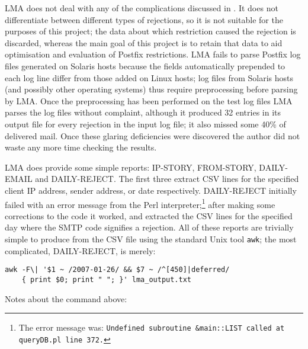 \gls{LMA} does not deal with any of the complications discussed in
.  It does not differentiate between different
types of rejections, so it is not suitable for the purposes of this
project; the data about which restriction caused the rejection is
discarded, whereas the main goal of this project is to retain that data to
aid optimisation and evaluation of Postfix restrictions.  \gls{LMA} fails
to parse Postfix log files generated on Solaris hosts because the fields
automatically prepended to each log line differ from those added on Linux
hosts; log files from Solaris hosts (and possibly other operating systems)
thus require preprocessing before parsing by \gls{LMA}.  Once the
preprocessing has been performed on the \numberOFlogFILES{} test log files
\gls{LMA} parses the log files without complaint, although it produced 32
entries in its output file for every rejection in the input log file; it
also missed some 40\% of delivered mail.  Once these glaring deficiencies
were discovered the author did not waste any more time checking the
results.

\gls{LMA} does provide some simple reports: IP-STORY, FROM-STORY,
DAILY-EMAIL and DAILY-REJECT\@.  The first three extract \gls{CSV} lines
for the specified client \gls{IP} address, sender address, or date
respectively.  DAILY-REJECT initially failed with an error message from the
Perl interpreter;\footnote{The error message was:
\newline{}\texttt{Undefined subroutine \&main::LIST called at queryDB.pl
line 372.}} after making some corrections to the code it worked, and
extracted the \gls{CSV} lines for the specified day where the \gls{SMTP}
code signifies a rejection.  All of these reports are trivially simple to
produce from the \gls{CSV} file using the standard Unix tool
\texttt{awk}; the most complicated, DAILY-REJECT, is merely:

\begin{verbatim}
awk -F\| '$1 ~ /2007-01-26/ && $7 ~ /^[450]|deferred/
    { print $0; print " "; }' lma_output.txt
\end{verbatim}

Notes about the command above:

